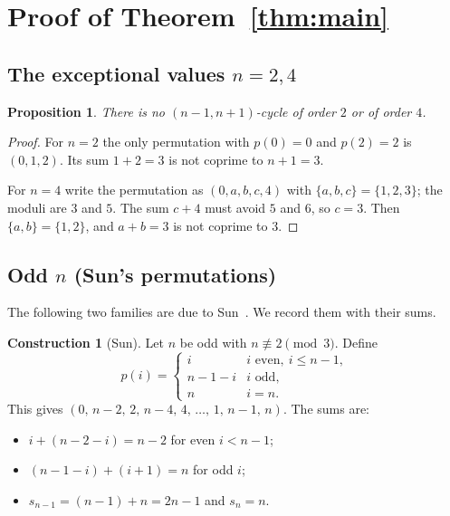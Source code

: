 \documentclass[11pt]{article}
\numberwithin{equation}{section}
\newtheorem{proposition}[theorem]{Proposition}
\theoremstyle{definition}
\newtheorem{construction}[theorem]{Construction}
\theoremstyle{remark}
\begin{document}
\section{Proof of \texorpdfstring{Theorem~\ref{thm:main}}{Theorem 1.2}}\label{sec:proof1}

\subsection{The exceptional values \texorpdfstring{$n=2,4$}{n = 2, 4}}

\begin{proposition}\label{prop:24}
There is no $(n-1,n+1)$-cycle of order $2$ or of order $4$.
\end{proposition}
\begin{proof}
For $n=2$ the only permutation with $p(0)=0$ and $p(2)=2$ is $(0,1,2)$. Its sum $1+2=3$ is not
coprime to $n+1=3$.

For $n=4$ write the permutation as $(0,a,b,c,4)$ with $\{a,b,c\}=\{1,2,3\}$; the moduli are $3$
and $5$. The sum $c+4$ must avoid $5$ and $6$, so $c=3$. Then $\{a,b\}=\{1,2\}$, and $a+b=3$ is
not coprime to $3$.
\end{proof}

\subsection{Odd \texorpdfstring{$n$}{n} (Sun's permutations)}\label{sec:odd}

The following two families are due to Sun~\cite[Remark~3.9(ii)]{Sun1309}. We record them with
their sums.

\begin{construction}[Sun]\label{con:oddA}
Let $n$ be odd with $n\not\equiv2\pmod3$. Define
\[
  p(i)=\begin{cases} i & i \text{ even},\ i\le n-1,\\ n-1-i & i\text{ odd},\\ n & i=n.\end{cases}
\]
This gives $(0,\,n-2,\,2,\,n-4,\,4,\,\dots,\,1,\,n-1,\,n)$. The sums are:
\begin{itemize}
  \item $i+(n-2-i)=n-2$ for even $i<n-1$;
  \item $(n-1-i)+(i+1)=n$ for odd $i$;
  \item $s_{n-1}=(n-1)+n=2n-1$ and $s_n=n$.
\end{itemize}
\end{construction}
\end{document}

